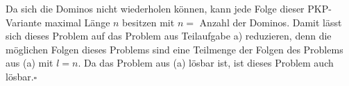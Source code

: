 Da sich die Dominos nicht wiederholen können, kann jede Folge dieser
PKP-Variante maximal Länge $n$ besitzen mit $n = $ Anzahl der Dominos. Damit
lässt sich dieses Problem auf das Problem aus Teilaufgabe a) reduzieren, denn
die möglichen Folgen dieses Problems sind eine Teilmenge der Folgen des Problems
aus (a) mit $l = n$. Da das Problem aus (a) lösbar ist, ist dieses Problem auch
lösbar.\hfill$\square$
